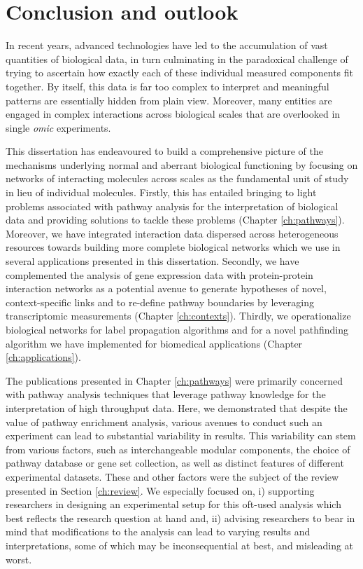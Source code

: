 \chapter{Conclusion and outlook}
\label{ch:conc}

In recent years, advanced technologies have led to the accumulation of vast quantities of biological data, in turn culminating in the paradoxical challenge of trying to ascertain how exactly each of these individual measured components fit together. By itself, this data is far too complex to interpret and meaningful patterns are essentially hidden from plain view. Moreover, many entities are engaged in complex interactions across biological scales that are overlooked in single \textit{omic} experiments. 

This dissertation has endeavoured to build a comprehensive picture of the mechanisms underlying normal and aberrant biological functioning by focusing on networks of interacting molecules across scales as the fundamental unit of study in lieu of individual molecules. Firstly, this has entailed bringing to light problems associated with pathway analysis for the interpretation of biological data and providing solutions to tackle these problems (Chapter \ref{ch:pathways}). Moreover, we have integrated interaction data dispersed across heterogeneous resources towards building more complete biological networks which we use in several applications presented in this dissertation. Secondly, we have complemented the analysis of gene expression data with protein-protein interaction networks as a potential avenue to generate hypotheses of novel, context-specific links and to re-define pathway boundaries by leveraging transcriptomic measurements (Chapter \ref{ch:contexts}). Thirdly, we operationalize biological networks for label propagation algorithms and for a novel pathfinding algorithm we have implemented for biomedical applications (Chapter \ref{ch:applications}).

The publications presented in Chapter \ref{ch:pathways} were primarily concerned with pathway analysis techniques that leverage pathway knowledge for the interpretation of high throughput data. Here, we demonstrated that despite the value of pathway enrichment analysis, various avenues to conduct such an experiment can lead to substantial variability in results. This variability can stem from various factors, such as interchangeable modular components, the choice of pathway database or gene set collection, as well as distinct features of different experimental datasets. These and other factors were the subject of the review presented in Section \ref{ch:review}. We especially focused on, i) supporting researchers in designing an experimental setup for this oft-used analysis which best reflects the research question at hand and, ii) advising researchers to bear in mind that modifications to the analysis can lead to varying results and interpretations, some of which may be inconsequential at best, and misleading at worst.

